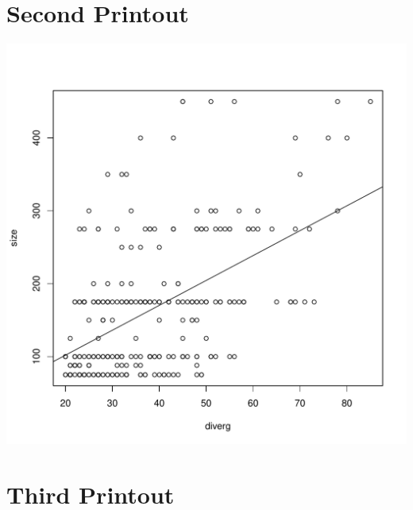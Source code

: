 \documentclass{article}
\begin{document}
\section*{Second Printout}

\begin{center}
   \includegraphics[width=\textwidth]{img/Lab4_print_2.pdf} 
\end{center}


\section*{Third Printout}
\end{document}
